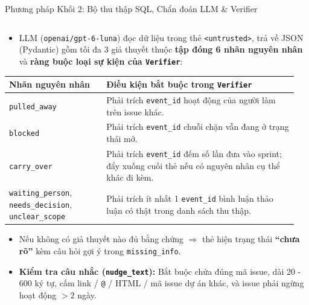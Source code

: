 \begin{frame}{Phương pháp Khối 2: Bộ thu thập SQL, Chẩn đoán LLM \& Verifier}
\begin{columns}[T,onlytextwidth]
\begin{column}{0.49\textwidth}
\begin{itemize}
        \item LLM (\texttt{openai/gpt-6-luna}) đọc dữ liệu trong thẻ \texttt{<untrusted>}, trả về JSON (Pydantic) gồm tối đa 3 giả thuyết thuộc \textbf{tập đóng 6 nhãn nguyên nhân} và \textbf{ràng buộc loại sự kiện của \texttt{Verifier}}:
      \end{itemize}
      \vspace{0.02cm}
      \setlength{\tabcolsep}{3pt}
      \renewcommand{\arraystretch}{1.10}
      \begin{tabular}{L{0.32\linewidth}|L{0.63\linewidth}}
        \textbf{Nhãn nguyên nhân} & \textbf{Điều kiện bắt buộc trong \texttt{Verifier}} \\
        \hline
        \texttt{pulled\_away} & Phải trích \texttt{event\_id} hoạt động của người làm trên issue khác. \\
        \texttt{blocked} & Phải trích \texttt{event\_id} chuỗi chặn vẫn đang ở trạng thái mở. \\
        \texttt{carry\_over} & Phải trích \texttt{event\_id} đếm số lần đưa vào sprint; \alert{đẩy xuống cuối thẻ} nếu có nguyên nhân cụ thể khác đi kèm. \\
        \texttt{waiting\_person}, \texttt{needs\_decision}, \texttt{unclear\_scope} & Phải trích ít nhất 1 \texttt{event\_id} bình luận thảo luận có thật trong danh sách thu thập. \\
      \end{tabular}
      \vspace{0.04cm}
      \begin{itemize}
        \setlength{\itemsep}{1pt}
        \item Nếu không có giả thuyết nào đủ bằng chứng $\Rightarrow$ thẻ hiện trạng thái \textbf{``chưa rõ''} kèm câu hỏi gợi ý trong \texttt{missing\_info}.
        \item \textbf{Kiểm tra câu nhắc (\texttt{nudge\_text}):} Bắt buộc chứa đúng mã issue, dài 20 - 600 ký tự, cấm link / \texttt{@} / HTML / mã issue dự án khác, và issue phải ngừng hoạt động $>2$ ngày.
      \end{itemize}
    \end{column}
  \end{columns}
\end{frame}

